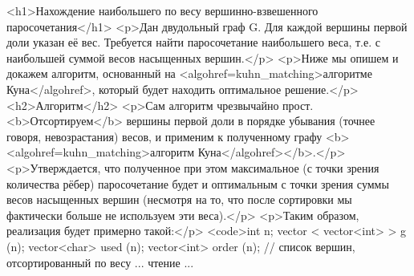 <h1>Нахождение наибольшего по весу вершинно-взвешенного паросочетания</h1>
<p>Дан двудольный граф G. Для каждой вершины первой доли указан её вес. Требуется найти паросочетание наибольшего веса, т.е. с наибольшей суммой весов насыщенных вершин.</p>
<p>Ниже мы опишем и докажем алгоритм, основанный на <algohref=kuhn_matching>алгоритме Куна</algohref>, который будет находить оптимальное решение.</p>
<h2>Алгоритм</h2>
<p>Сам алгоритм чрезвычайно прост. <b>Отсортируем</b> вершины первой доли в порядке убывания (точнее говоря, невозрастания) весов, и применим к полученному графу <b><algohref=kuhn_matching>алгоритм Куна</algohref></b>.</p>
<p>Утверждается, что полученное при этом максимальное (с точки зрения количества рёбер) паросочетание будет и оптимальным с точки зрения суммы весов насыщенных вершин (несмотря на то, что после сортировки мы фактически больше не используем эти веса).</p>
<p>Таким образом, реализация будет примерно такой:</p>
<code>int n;
vector < vector<int> > g (n);
vector<char> used (n);
vector<int> order (n); // список вершин, отсортированный по весу
... чтение ...

